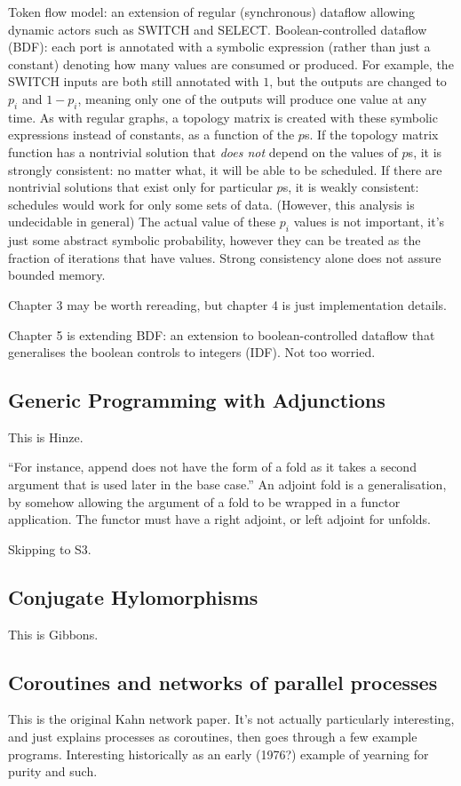 Token flow model: an extension of regular (synchronous) dataflow allowing dynamic actors such as SWITCH and SELECT.
Boolean-controlled dataflow (BDF): each port is annotated with a symbolic expression (rather than just a constant) denoting how many values are consumed or produced.
For example, the SWITCH inputs are both still annotated with $1$, but the outputs are changed to $p_i$ and $1 - p_i$, meaning only one of the outputs will produce one value at any time.
As with regular graphs, a topology matrix is created with these symbolic expressions instead of constants, as a function of the $p$s.
If the topology matrix function has a nontrivial solution that \emph{does not} depend on the values of $p$s, it is strongly consistent: no matter what, it will be able to be scheduled.
If there are nontrivial solutions that exist only for particular $p$s, it is weakly consistent: schedules would work for only some sets of data.
(However, this analysis is undecidable in general)
The actual value of these $p_i$ values is not important, it's just some abstract symbolic probability, however they can be treated as the fraction of iterations that have values.
Strong consistency alone does not assure bounded memory.

Chapter 3 may be worth rereading, but chapter 4 is just implementation details.

Chapter 5 is extending BDF: an extension to boolean-controlled dataflow that generalises the boolean controls to integers (IDF). Not too worried.

\subsection{Generic Programming with Adjunctions}
This is Hinze\cite{hinze2012generic}.

``For instance, append does not have the form of a fold as it takes a second argument that is used later in the base case.''
An adjoint fold is a generalisation, by somehow allowing the argument of a fold to be wrapped in a functor application.
The functor must have a right adjoint, or left adjoint for unfolds.

Skipping to S3.



\subsection{Conjugate Hylomorphisms}
This is Gibbons\cite{gibbons2015conjugate}.


\subsection{Coroutines and networks of parallel processes}
This is the original Kahn network paper\cite{kahn1976coroutines}.
It's not actually particularly interesting, and just explains processes as coroutines, then goes through a few example programs.
Interesting historically as an early (1976?) example of yearning for purity and such.


